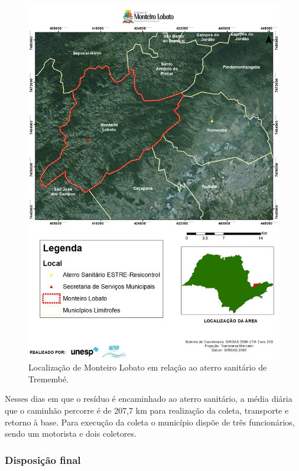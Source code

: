 \begin{figure}
	\centering
	\includegraphics[width=1\linewidth]{produtos/prodtres/image017}
	\caption{Localização de Monteiro Lobato em relação ao aterro sanitário de Tremembé.}
	\label{fig:image017}
\end{figure}


Nesses dias em que o resíduo é encaminhado ao aterro sanitário, a média diária que o caminhão percorre é de 207,7 km para realização da coleta, transporte e retorno à base. Para execução da coleta o município dispõe de três funcionários, sendo um motorista e dois coletores.

\subsubsection{Disposição final}

